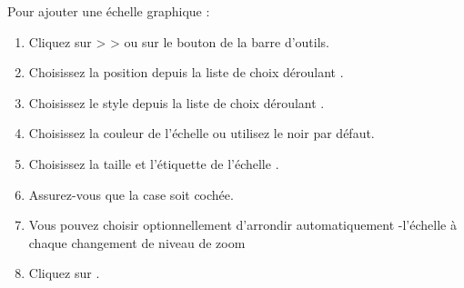 Pour ajouter une échelle graphique :

\begin{enumerate}
\item Cliquez sur  >  >  ou sur le bouton   de la barre d'outils.
\item Choisissez la position depuis la liste de choix déroulant .
\item Choisissez le style depuis la liste de choix déroulant .
\item Choisissez la couleur de l'échelle  ou utilisez le noir par défaut.
\item Choisissez la taille et l'étiquette de l'échelle .
\item Assurez-vous que la case  soit cochée.
\item Vous pouvez choisir optionnellement d'arrondir automatiquement -l'échelle
 à chaque changement de niveau de zoom 
\item Cliquez sur .
\end{enumerate}


